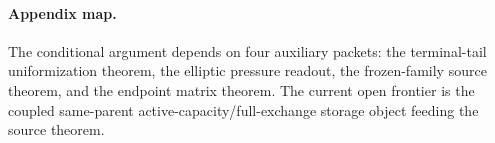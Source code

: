 \paragraph{Appendix map.}
The conditional argument depends on four auxiliary packets: the terminal-tail uniformization theorem, the elliptic pressure readout, the frozen-family source theorem, and the endpoint matrix theorem. The current open frontier is the coupled same-parent active-capacity/full-exchange storage object feeding the source theorem.
